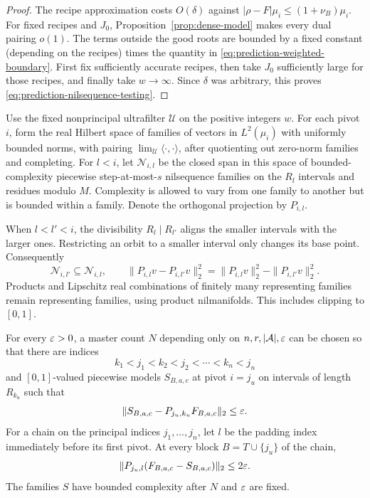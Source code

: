 \begin{proof}
The recipe approximation costs $O(\delta)$ against
$|\rho-F|\mu_i\leq(1+\nu_B)\mu_i$.  For fixed recipes and $J_0$,
Proposition~\ref{prop:dense-model} makes every dual pairing $o(1)$.
The terms outside the good roots are bounded by a fixed constant
(depending on the recipes) times the quantity in
\eqref{eq:prediction-weighted-boundary}.  First fix sufficiently
accurate recipes, then take $J_0$ sufficiently large for those
recipes, and finally take $w\to\infty$.  Since $\delta$ was arbitrary,
this proves \eqref{eq:prediction-nilsequence-testing}.
\end{proof}

Use the fixed nonprincipal ultrafilter $\mathcal U$ on the positive
integers $w$. For each pivot $i$, form the real Hilbert space of families of
vectors in $L^2(\mu_i)$ with uniformly bounded norms, with pairing
$\lim_{\mathcal U}\langle\cdot,\cdot\rangle$, after quotienting out
zero-norm families and completing.  For $l<i$, let $\mathcal N_{i,l}$
be the closed span in this space of bounded-complexity piecewise
step-at-most-$s$ nilsequence families on the $R_l$ intervals and
residues modulo $M$.  Complexity is allowed to vary from one family
to another but is bounded within a family.  Denote the orthogonal
projection by $P_{i,l}$.

When $l<l'<i$, the divisibility $R_l\mid R_{l'}$ aligns the smaller
intervals with the larger ones.  Restricting an orbit to a smaller
interval only changes its base point.  Consequently
\begin{equation}\label{eq:prediction-nested-spaces}
 \mathcal N_{i,l'}\subseteq\mathcal N_{i,l},\qquad
 \|P_{i,l}v-P_{i,l'}v\|_2^2
 =\|P_{i,l}v\|_2^2-\|P_{i,l'}v\|_2^2.
\end{equation}
Products and Lipschitz real combinations of finitely many representing
families remain representing families, using product nilmanifolds.
This includes clipping to $[0,1]$.

\begin{lemma}\label{lem:energy-selection}
For every $\varepsilon>0$, a master count $N$ depending only on
$n,r,|\mathcal A|,\varepsilon$ can be chosen so that there are indices
\[
 k_1<j_1<k_2<j_2<\cdots<k_n<j_n
\]
and $[0,1]$-valued piecewise models $S_{B,a,c}$ at pivot $i=j_u$
on intervals of length $R_{k_u}$ such that
\begin{equation}\label{eq:prediction-coarse-approximation}
 \|S_{B,a,c}-P_{j_u,k_u}F_{B,a,c}\|_2\leq\varepsilon.
\end{equation}
For a chain on the principal indices $j_1,\ldots,j_n$, let $l$ be the
padding index immediately before its first pivot.  At every block
$B=T\cup\{j_u\}$ of the chain,
\begin{equation}\label{eq:prediction-fine-projection}
 \|P_{j_u,l}(F_{B,a,c}-S_{B,a,c})\|_2\leq2\varepsilon.
\end{equation}
The families $S$ have bounded complexity after $N$ and $\varepsilon$ are fixed.
\end{lemma}


